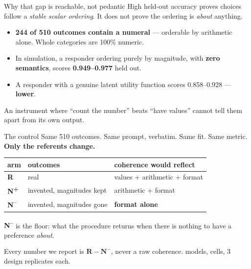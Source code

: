 \documentclass[aspectratio=169,11pt]{beamer}
\newcommand{\hl}[1]{\textcolor{accent}{\textbf{#1}}}
\begin{document}
\begin{frame}{Why that gap is reachable, not pedantic}
  High held-out accuracy proves choices follow a \emph{stable scalar ordering}.
  It does not prove the ordering is \emph{about} anything.

  \bigskip
  \begin{itemize}
    \item \hl{244 of 510 outcomes contain a numeral} --- orderable by
      arithmetic alone. Whole categories are 100\% numeric.
    \item In simulation, a responder ordering purely by magnitude, with
      \hl{zero semantics}, scores \hl{0.949--0.977} held out.
    \item A responder with a genuine latent utility function scores
      0.858--0.928 --- \hl{lower}.
  \end{itemize}

  \bigskip
  An instrument where ``count the number'' beats ``have values'' cannot tell
  them apart from its own output.
\end{frame}

\begin{frame}{The control}
  Same 510 outcomes. Same prompt, verbatim. Same fit. Same metric.
  \hl{Only the referents change.}

  \bigskip
  \begin{center}
  \begin{tabular}{@{}lll@{}}
    \toprule
    arm & outcomes & coherence would reflect \\
    \midrule
    \textbf{R}                  & real & values $+$ arithmetic $+$ format \\
    \textbf{N\textsuperscript{+}} & invented, magnitudes kept & arithmetic $+$ format \\
    \textbf{N\textsuperscript{--}} & invented, magnitudes gone & \hl{format alone} \\
    \bottomrule
  \end{tabular}
  \end{center}

  \bigskip
  \textbf{N\textsuperscript{--}} is the floor: what the procedure returns when
  there is nothing to have a preference \emph{about}.

  \medskip
  \small Every number we report is $\mathbf{R} - \mathbf{N^{-}}$, never a raw
  coherence. \NModels{} models, \NCells{} cells, 3 design replicates each.
\end{frame}
\end{document}
